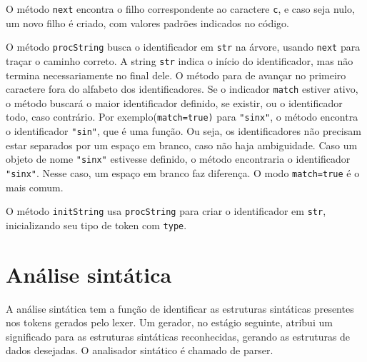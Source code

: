 \documentclass[10pt,a4paper]{article}
\begin{document}
O método \texttt{next} encontra o filho correspondente ao caractere \texttt{c}, e caso seja nulo,
um novo filho é criado, com valores padrões indicados no código.

O método \texttt{procString} busca o identificador em \texttt{str} na árvore,
usando \texttt{next} para traçar o caminho correto.
A string \texttt{str} indica o início do identificador, mas não termina necessariamente no final dele.
O método para de avançar no primeiro caractere fora do alfabeto dos identificadores.
Se o indicador \texttt{match} estiver ativo, o método buscará o maior identificador definido,
se existir, ou o identificador todo, caso contrário.
Por exemplo(\texttt{match=true)} para \texttt{"sinx"}, o método encontra o identificador \texttt{"sin"},
que é uma função. Ou seja, os identificadores não precisam estar separados por um espaço em branco,
caso não haja ambiguidade.
Caso um objeto de nome \texttt{"sinx"} estivesse definido,
o método encontraria o identificador \texttt{"sinx"}.
Nesse caso, um espaço em branco faz diferença. O modo \texttt{match=true} é o mais comum.

O método \texttt{initString} usa \texttt{procString} para criar o identificador em \texttt{str},
inicializando seu tipo de token com \texttt{type}.


\section{Análise sintática}
A análise sintática tem a função de identificar as estruturas sintáticas presentes nos tokens gerados pelo lexer.
Um gerador, no estágio seguinte, atribui um significado para as estruturas sintáticas reconhecidas,
gerando as estruturas de dados desejadas. O analisador sintático é chamado de parser.
\end{document}
